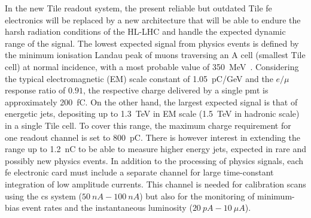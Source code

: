 In the new Tile readout system, the present reliable but outdated Tile \gls{fe} electronics will be replaced by a new
architecture that will be able to endure the harsh radiation conditions of the HL-LHC and handle the expected dynamic
range of the signal. The lowest expected signal from physics events is defined by the minimum ionisation Landau peak 
of muons traversing an A cell (smallest Tile cell) at normal incidence, with a most probable value of
\SI{350}{MeV}~\cite{Adragna:2009zz}. Considering the typical electromagnetic (EM) scale constant of \SI{1.05}{pC/GeV} 
and the $e/\mu$ response ratio of $0.91$, the respective charge delivered by a single \gls{pmt} is approximately 
\SI{200}{fC}. On the other hand, the largest expected signal is that of energetic jets, depositing up to \SI{1.3}{TeV} 
in EM scale (\SI{1.5}{TeV} in hadronic scale) in a single Tile cell. To cover this range, the maximum charge requirement 
for one readout channel is set to \SI{800}{pC}. There is however interest in extending the range up to \SI{1.2}{nC} to 
be able to measure higher energy jets, expected in rare and possibly new physics events. In addition to the processing 
of physics signals, each \gls{fe} electronic card must include a separate channel for large time-constant integration 
of low amplitude currents. This channel is needed for calibration scans using the \gls{cs} system ($\SI{50}{nA}-\SI{100}{nA}$) 
but also for the monitoring of minimum-bias event rates and the instantaneous luminosity ($\SI{20}{pA}-\SI{10}{\mu A}$).

